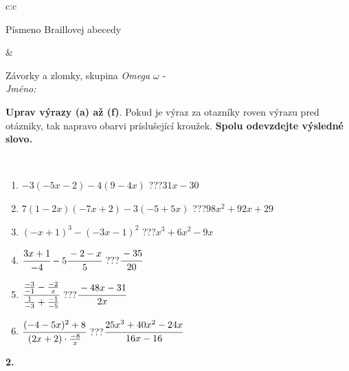 \documentclass[10pt]{report}
\begin{document}
\begin{tabular}{c:c}
\begin{minipage}[c][104.5mm][t]{0.5\linewidth}
\begin{center}
\begin{minipage}{0.20\linewidth}
\begin{center}
{\small Písmeno Braillovej abecedy}
\end{center}
\end{minipage}
\end{center}
\end{minipage}
&
\begin{minipage}[c][104.5mm][t]{0.5\linewidth}
\begin{center}
\vspace{7mm}
{\huge Závorky a zlomky, skupina \textit{Omega $\omega$} -}\\[5mm]
\textit{Jméno:}\phantom{xxxxxxxxxxxxxxxxxxxxxxxxxxxxxxxxxxxxxxxxxxxxxxxxxxxxxxxxxxxxxxxxx}\\[5mm]
\begin{minipage}{0.95\linewidth}
\begin{center}
\textbf{Uprav výrazy (a) až (f)}. Pokud je výraz za otazníky roven výrazu pred otázniky, tak napravo obarvi príslušející kroužek. \textbf{Spolu odevzdejte výsledné slovo.}
\end{center}
\end{minipage}
\\[1mm]
\begin{minipage}{0.79\linewidth}
\begin{center}
\begin{varwidth}{\linewidth}
\begin{enumerate}
\normalsize
\item $-3(-5x-2)-4(9-4x)$\quad \dotfill\; ???\;\dotfill \quad $31x-30$
\item $7(1-2x)(-7x+2)-3(-5+5x)$\quad \dotfill\; ???\;\dotfill \quad $98x^2+92x+29$
\item $(-x+1)^3-(-3x-1)^2$\quad \dotfill\; ???\;\dotfill \quad $x^3+6x^2-9x$
\item $\cfrac{3x+1}{-4}-5\cfrac{-2-x}{5}$\quad \dotfill\; ???\;\dotfill \quad $\cfrac{-35}{20}$
\item $\cfrac{\frac{-3}{-1}-\frac{-2}{x}}{\frac{1}{-3}+\frac{-1}{-5}}$\quad \dotfill\; ???\;\dotfill \quad $\cfrac{-48x-31}{2x}$
\item $\cfrac{(-4-5x)^2+8}{(2x+2)\cdot\frac{-8}{x}}$\quad \dotfill\; ???\;\dotfill \quad $\cfrac{25x^3+40x^2-24x}{16x-16}$
\end{enumerate}
\end{varwidth}
\end{center}
\end{minipage}
\begin{minipage}{0.20\linewidth}
\begin{center}
{\Huge\bfseries 2.} \\[2mm]

\end{center}
\end{minipage}
\end{center}
\end{minipage}
\end{tabular}
\end{document}
